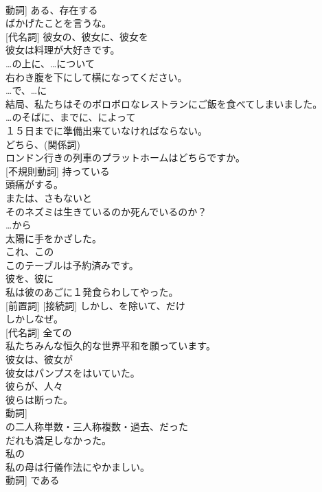 \documentclass[8pt]{extreport}
\begin{document}
\begin{CJK}{UTF8}{min}
\\	動詞]	ある、存在する	
\\	ばかげたことを言うな。	
\\	[限定詞] [代名詞]	彼女の、彼女に、彼女を	
\\	彼女は料理が大好きです。	
\\	[前置詞]	…の上に、…について	
\\	右わき腹を下にして横になってください。	
\\	[前置詞]	…で、…に	
\\	結局、私たちはそのボロボロなレストランにご飯を食べてしまいました。	
\\	[前置詞]	…のそばに、までに、によって	
\\	１５日までに準備出来ていなければならない。	
\\	[代名詞]	どちら、(関係詞)	
\\	ロンドン行きの列車のプラットホームはどちらですか。	
\\	[動詞] [不規則動詞]	持っている	
\\	頭痛がする。	
\\	[接続詞]	または、さもないと	
\\	そのネズミは生きているのか死んでいるのか？	
\\	[前置詞]	…から	
\\	太陽に手をかざした。	
\\	[代名詞]	これ、この	
\\	このテーブルは予約済みです。	
\\	[代名詞]	彼を、彼に	
\\	私は彼のあごに１発食らわしてやった。	
\\	[副詞] [前置詞] [接続詞]	しかし、を除いて、だけ	
\\	しかしなぜ。	
\\	[形容詞] [代名詞]	全ての	
\\	私たちみんな恒久的な世界平和を願っています。	
\\	[代名詞]	彼女は、彼女が	
\\	彼女はパンプスをはいていた。	
\\	[代名詞]	彼らが、人々	
\\	彼らは断った。	
\\	動詞]	
\\	の二人称単数・三人称複数・過去、だった	
\\	だれも満足しなかった。	
\\	[限定詞]	私の	
\\	私の母は行儀作法にやかましい。	
\\	動詞]	である	

\end{CJK}
\end{document}
